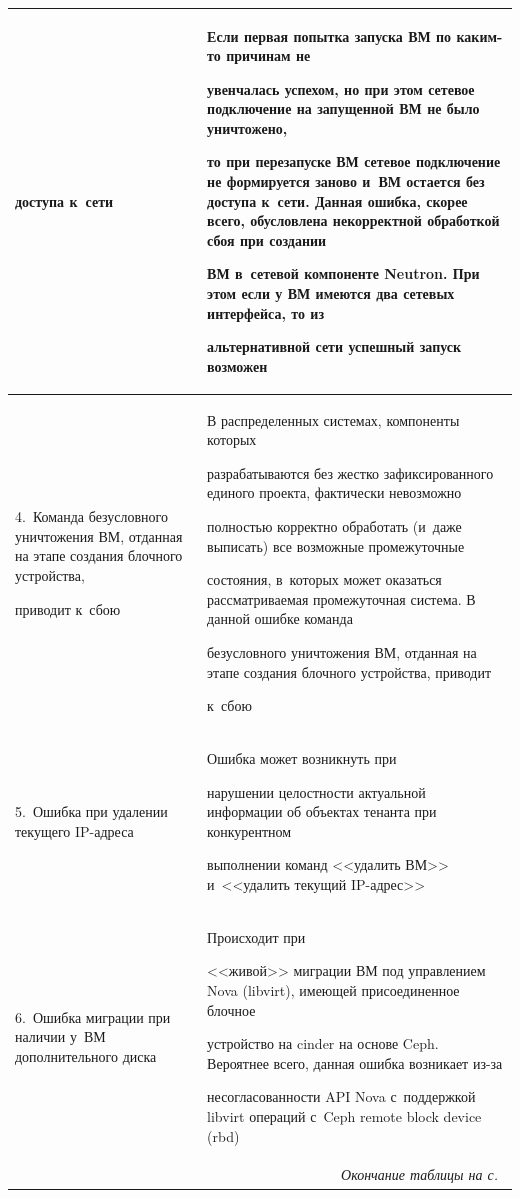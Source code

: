 \begin{table}
\begin{center}
\begin{tabular}{|p{30mm}|p{91mm}|}
доступа к~сети~\cite{5-g7}&Если первая попытка запуска ВМ по каким-то причинам не 


увенчалась успехом, но при этом сетевое подключение на запущенной ВМ не было уничтожено, 


то при перезапуске ВМ сетевое подключение не формируется заново и~ВМ остается без доступа к~сети. Данная ошибка, скорее всего, обусловлена некорректной обработкой сбоя при создании 


ВМ в~сетевой компоненте Neutron. При этом если у ВМ имеются два сетевых интерфейса, то из 


альтернативной сети успешный запуск возможен \\


\hline


4.~Команда безусловного уничтожения ВМ, отданная на этапе создания блочного устройства, 


приводит к~сбою~\cite{6-g7}&В распределенных сис\-те\-мах, компоненты которых 


разрабатываются без жестко зафиксированного единого проекта, фактически невозможно 


полностью корректно обработать (и~даже выписать) все возможные промежуточные 


со\-сто\-яния, в~которых может оказаться рассматриваемая промежуточная сис\-те\-ма. В данной ошибке команда 


безусловного уничтожения ВМ, отданная на этапе создания блочного устройства, приводит 


к~сбою\\


\hline


5.~Ошибка при удалении текущего IP-ад\-ре\-са~\cite{7-g7}&Ошибка может возникнуть при 


нарушении целостности актуальной информации об объектах тенанта при конкурентном 


выполнении команд <<удалить ВМ>> и~<<удалить текущий IP-ад\-рес>> \\


\hline


6.~Ошибка миграции при наличии у~ВМ дополнительного диска~\cite{8-g7}&Происходит при 


<<живой>> миграции ВМ под управлением Nova (libvirt), име\-ющей присоединенное блочное 


устройство на cinder на основе Ceph. Вероятнее всего, данная ошибка возникает из-за 


несогласованности API Nova с~поддержкой libvirt операций с~Ceph remote block device (rbd)\\


\hline


\multicolumn{2}{r}{\textit{Окончание таблицы на с.}~\pageref{e1}}


\end{tabular}


\end{center}


\end{table}





